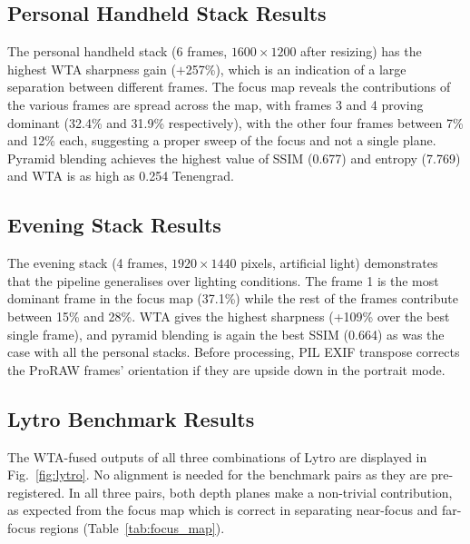 \documentclass[conference]{IEEEtran}
\begin{document}
\subsection{Personal Handheld Stack Results}

The personal handheld stack (6 frames, $1600\!\times\!1200$ after resizing) has the highest WTA sharpness gain ($+$257\%), which is an indication of a large separation between different frames. The focus map reveals the contributions of the various frames are spread across the map, with frames 3 and 4 proving dominant (32.4\% and 31.9\% respectively), with the other four frames between 7\% and 12\% each, suggesting a proper sweep of the focus and not a single plane. Pyramid blending achieves the highest value of SSIM (0.677) and entropy (7.769) and WTA is as high as 0.254 Tenengrad.

\subsection{Evening Stack Results}

The evening stack (4 frames, $1920\!\times\!1440$ pixels, artificial light) demonstrates that the pipeline generalises over lighting conditions. The frame 1 is the most dominant frame in the focus map (37.1\%) while the rest of the frames contribute between 15\% and 28\%. WTA gives the highest sharpness (+109\% over the best single frame), and pyramid blending is again the best SSIM (0.664) as was the case with all the personal stacks. Before processing, PIL EXIF transpose corrects the ProRAW frames' orientation if they are upside down in the portrait mode.

\subsection{Lytro Benchmark Results}

The WTA-fused outputs of all three combinations of Lytro are displayed in Fig.~\ref{fig:lytro}. No alignment is needed for the benchmark pairs as they are pre-registered. In all three pairs, both depth planes make a non-trivial contribution, as expected from the focus map which is correct in separating near-focus and far-focus regions (Table~\ref{tab:focus_map}).
\end{document}
